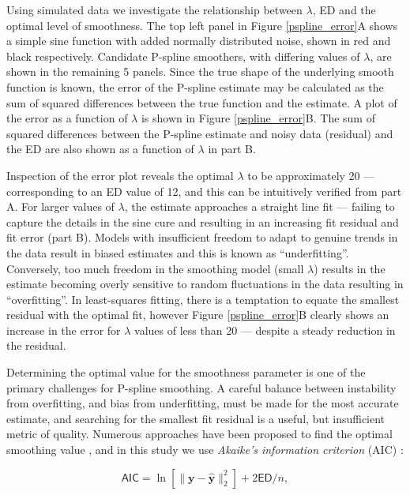 \documentclass[num-refs]{wiley-article}
\begin{document}
Using simulated data we investigate the relationship between $\lambda$, ED and the optimal level of smoothness. The top left panel in Figure \ref{pspline_error}A shows a simple sine function with added normally distributed noise, shown in red and black respectively. Candidate P-spline smoothers, with differing values of $\lambda$, are shown in the remaining 5 panels. Since the true shape of the underlying smooth function is known, the error of the P-spline estimate may be calculated as the sum of squared differences between the true function and the estimate. A plot of the error as a function of $\lambda$ is shown in Figure \ref{pspline_error}B. The sum of squared differences between the P-spline estimate and noisy data (residual) and the ED are also shown as a function of $\lambda$ in part B.

Inspection of the error plot reveals the optimal $\lambda$ to be approximately 20 --- corresponding to an ED value of 12, and this can be intuitively verified from part A. For larger values of $\lambda$, the estimate approaches a straight line fit --- failing to capture the details in the sine cure and resulting in an increasing fit residual and fit error (part B). Models with insufficient freedom to adapt to genuine trends in the data result in biased estimates and this is known as ``underfitting''. Conversely, too much freedom in the smoothing model (small $\lambda$) results in the estimate becoming overly sensitive to random fluctuations in the data resulting in ``overfitting''. In least-squares fitting, there is a temptation to equate the smallest residual with the optimal fit, however Figure \ref{pspline_error}B clearly shows an increase in the error for $\lambda$ values of less than 20 --- despite a steady reduction in the residual.

Determining the optimal value for the smoothness parameter is one of the primary challenges for P-spline smoothing. A careful balance between instability from overfitting, and bias from underfitting, must be made for the most accurate estimate, and searching for the smallest fit residual is a useful, but insufficient metric of quality. Numerous approaches have been proposed to find the optimal smoothing value \cite{Ruppert2003}, and in this study we use \textit{Akaike's information criterion} (AIC) \cite{Akaike1973}:

\begin{equation}
  \textsf{AIC} = \ln \left[ \|\mathbf{y} - \hat{\mathbf{y}}\|^{2}_{2} \right] + 2 \textsf{ED} / n,
  \label{aic}
\end{equation}
\end{document}
